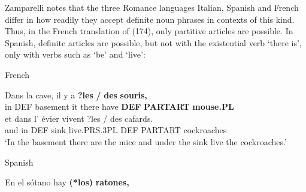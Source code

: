 
Zamparelli notes that the three Romance languages Italian, Spanish and French differ in how readily they accept definite noun phrases in contexts of this kind. Thus, in the French translation of (174), only partitive articles are possible. In Spanish, definite articles are possible, but not with the existential verb  ‘there is’, only with verbs such as  ‘be’ and  ‘live’:


\item 

\label{bkm:Ref172696738}French



 \ea\label{}
\gll Dans  la  cave,  il  y  a  \textbf{?les} \textbf{/} \textbf{des} \textbf{souris,}\\


in  DEF  basement  it  there  have  \textbf{DEF}  \textbf{PARTART} \textbf{mouse.PL}\\

 \ea\label{}
\gll et  dans  l’  évier  vivent  ?les  /  des  cafards.\\


and  in  DEF  sink  live.PRS.3PL  DEF    PARTART  cockroaches\\

\glt ‘In the basement there are the mice and under the sink live the cockroaches.’ 

\z

\item 

Spanish



 \ea\label{}
\gll En  el  sótano  hay  \textbf{(*los)}\textbf{  ratones,}\\


